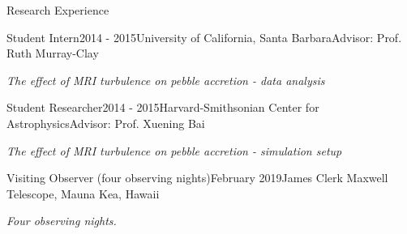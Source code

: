 \documentclass{resume} %
\begin{document}
\begin{rSection}{Research Experience}
\begin{rSubsection}{Student Intern}{2014 - 2015}{University of California, Santa Barbara}{Advisor: Prof. Ruth Murray-Clay}
\item \emph{{The effect of MRI turbulence on pebble accretion - data analysis}} 
\end{rSubsection}

\begin{rSubsection}{Student Researcher}{2014 - 2015}{Harvard-Smithsonian Center for Astrophysics}{Advisor: Prof. Xuening Bai}
\item \emph{{The effect of MRI turbulence on pebble accretion - simulation setup}} 
\end{rSubsection}




\begin{rSubsection}{Visiting Observer (four observing nights)}{February 2019}{James Clerk Maxwell Telescope, Mauna Kea, Hawaii}{}
\item \emph{Four observing nights.}
\end{rSubsection}

\end{rSection}
\end{document}
